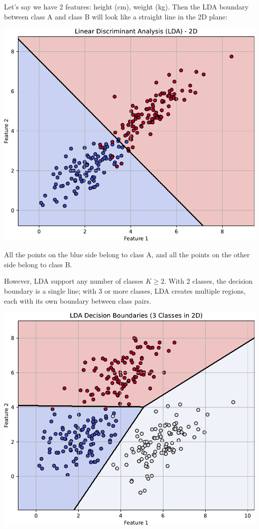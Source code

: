 \newpage

\begin{examplebox}
    Let's say we have 2 features: height (cm), weight (kg). Then the LDA boundary between class A and class B will look like a straight line in the 2D plane:

    \begin{center}
        \captionsetup{type=figure}
        \includegraphics[width=\textwidth]{img/lda/lda-2d.pdf}
    \end{center}

    All the points on the blue side belong to class A, and all the points on the other side belong to class B.

    \highspace
    However, LDA support any number of classes $K \ge 2$. With 2 classes, the decision boundary is a single line; with 3 or more classes, LDA creates multiple regions, each with its own boundary between class pairs.

    \begin{center}
        \captionsetup{type=figure}
        \includegraphics[width=\textwidth]{img/lda/lda-2d-3-classes.pdf}
    \end{center}


\end{examplebox}
